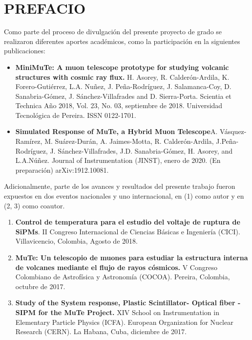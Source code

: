 
\chapter{PREFACIO}
\label{Cap:Prefacio}
Como parte del proceso de divulgación del presente proyecto de grado se realizaron diferentes aportes académicos, como la participación en la siguientes publicaciones:
\begin{itemize}
	\item \textbf{MiniMuTe: A muon telescope prototype for studying volcanic structures with cosmic ray flux.} H. Asorey, R. Calderón-Ardila, K. Forero-Gutiérrez, L.A. Nuñez, J. Peña-Rodríguez, J. Salamanca-Coy, D. Sanabria-Gómez, J. Sánchez-Villafrades and D. Sierra-Porta. Scientia  et Technica  Año 2018, Vol. 23, No. 03, septiembre  de 2018. Universidad  Tecnológica  de Pereira. ISSN 0122-1701.
	\item \textbf{Simulated Response of MuTe, a Hybrid Muon Telescope}A. Vásquez-Ramírez, M. Suárez-Durán, A. Jaimes-Motta, R. Calderón-Ardila, J.Peña-Rodríguez, J. Sánchez-Villafrades, J.D. Sanabria-Gómez, H. Asorey, and L.A.Núñez. Journal of Instrumentation (JINST), enero de 2020. (En preparación) arXiv:1912.10081.
\end{itemize} 
Adicionalmente, parte de los avances y resultados del presente trabajo fueron expuestos en dos eventos nacionales y uno internacional, en (1) como autor y en (2, 3) como coautor.
\begin{enumerate}
	\item \textbf{Control de temperatura para el estudio del voltaje de ruptura de SiPMs}. II Congreso Internacional de Ciencias Básicas e Ingeniería (CICI). Villavicencio, Colombia, Agosto de 2018.
	\item \textbf{MuTe: Un telescopio de muones para estudiar la estructura interna de volcanes mediante el flujo de rayos cósmicos.} V Congreso Colombiano de Astrofísica y Astronomía (COCOA). Pereira, Colombia, octubre de 2017.
	\item \textbf{Study of the System response, Plastic Scintillator- Optical fiber - SIPM for the MuTe Project.} XIV School on Instrumentation in Elementary Particle Physics (ICFA). European Organization for Nuclear Research (CERN). La Habana, Cuba, diciembre de 2017.
\end{enumerate}


